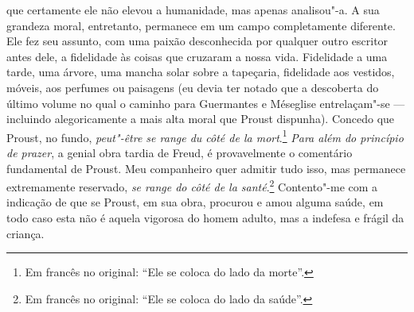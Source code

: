 que certamente ele não elevou a humanidade, mas apenas analisou"-a. A sua
grandeza moral, entretanto, permanece em um campo completamente
diferente. Ele fez seu assunto, com uma paixão desconhecida por qualquer
outro escritor antes dele, a fidelidade às coisas que cruzaram a nossa
vida. Fidelidade a uma tarde, uma árvore, uma mancha solar sobre a
tapeçaria, fidelidade aos vestidos, móveis, aos perfumes ou paisagens
(eu devia ter notado que a descoberta do último volume no qual o caminho
para Guermantes e Méseglise entrelaçam"-se --- incluindo alegoricamente a
mais alta moral que Proust dispunha). Concedo que Proust, no fundo,
\emph{peut"-être se range du côté de la mort}.\footnote{Em francês no original: ``Ele se
  coloca do lado da morte''. \versal{[N. T.]}} \emph{Para além
do princípio de prazer}, a genial obra tardia de Freud, é provavelmente
o comentário fundamental de Proust. Meu companheiro quer admitir tudo
isso, mas permanece extremamente reservado, \emph{se range do côté de la
santé}.\footnote{Em francês no original: ``Ele se coloca do lado da
  saúde''. \versal{[N. T.]}} Contento"-me com a indicação de que
se Proust, em sua obra, procurou e amou alguma saúde, em todo caso esta
não é aquela vigorosa do homem adulto, mas a indefesa e frágil da
criança.

